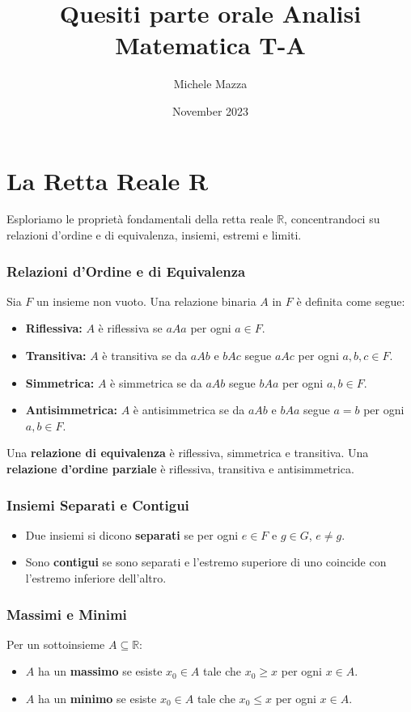 \documentclass{book}
\title{Quesiti parte orale Analisi Matematica T-A}
\author{Michele Mazza}
\date{November 2023}
\begin{document}
\frontmatter
\maketitle
\tableofcontents
\mainmatter
\chapter{La Retta Reale R}
Esploriamo le proprietà fondamentali della retta reale \( \mathbb{R} \), concentrandoci su relazioni d'ordine e di equivalenza, insiemi, estremi e limiti.

\subsection*{Relazioni d'Ordine e di Equivalenza}
Sia \( F \) un insieme non vuoto. Una relazione binaria \( A \) in \( F \) è definita come segue:
\begin{itemize}
  \item \textbf{Riflessiva:} \( A \) è riflessiva se \( aAa \) per ogni \( a \in F \).
  \item \textbf{Transitiva:} \( A \) è transitiva se da \( aAb \) e \( bAc \) segue \( aAc \) per ogni \( a, b, c \in F \).
  \item \textbf{Simmetrica:} \( A \) è simmetrica se da \( aAb \) segue \( bAa \) per ogni \( a, b \in F \).
  \item \textbf{Antisimmetrica:} \( A \) è antisimmetrica se da \( aAb \) e \( bAa \) segue \( a=b \) per ogni \( a, b \in F \).
\end{itemize}
Una \textbf{relazione di equivalenza} è riflessiva, simmetrica e transitiva. Una \textbf{relazione d'ordine parziale} è riflessiva, transitiva e antisimmetrica.

\subsection*{Insiemi Separati e Contigui}
\begin{itemize}
  \item Due insiemi si dicono \textbf{separati} se per ogni \( e \in F \) e \( g \in G \), \( e \neq g \).
  \item Sono \textbf{contigui} se sono separati e l'estremo superiore di uno coincide con l'estremo inferiore dell'altro.
\end{itemize}

\subsection*{Massimi e Minimi}
Per un sottoinsieme \( A \subseteq \mathbb{R} \):
\begin{itemize}
  \item \( A \) ha un \textbf{massimo} se esiste \( x_0 \in A \) tale che \( x_0 \geq x \) per ogni \( x \in A \).
  \item \( A \) ha un \textbf{minimo} se esiste \( x_0 \in A \) tale che \( x_0 \leq x \) per ogni \( x \in A \).
\end{itemize}
\end{document}
